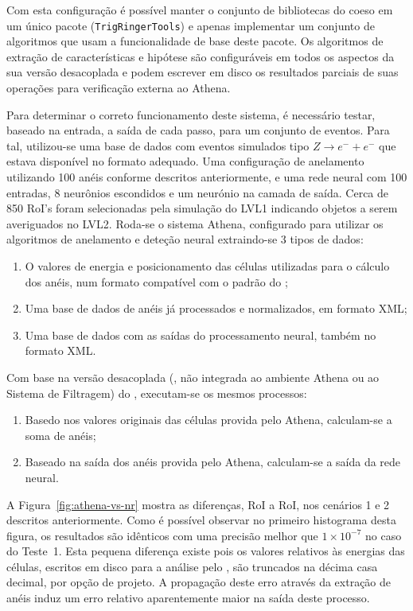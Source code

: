 Com esta configuração é possível manter o conjunto de bibliotecas do
 coeso em um único pacote (\texttt{TrigRingerTools}) e
apenas implementar um conjunto de algoritmos que usam a funcionalidade de base
deste pacote. Os algoritmos de extração de características e hipótese são
configuráveis em todos os aspectos da sua versão desacoplada e podem escrever
em disco os resultados parciais de suas operações para verificação externa ao
Athena.

Para determinar o correto funcionamento deste sistema, é necessário testar,
baseado na entrada, a saída de cada passo, para um conjunto de eventos. Para
tal, utilizou-se uma base de dados com eventos simulados tipo $Z \rightarrow
e^- + e^-$ que estava disponível no formato adequado. Uma configuração de
anelamento utilizando 100 anéis conforme descritos anteriormente, e uma rede
neural com 100 entradas, 8 neurônios escondidos e um neurónio na camada de
saída. Cerca de 850 RoI's foram selecionadas pela simulação do LVL1 indicando
objetos a serem averiguados no LVL2. Roda-se o sistema Athena, configurado
para utilizar os algoritmos de anelamento e deteção neural extraindo-se 3
tipos de dados:

\begin{enumerate}
\item O valores de energia e posicionamento das células utilizadas para o
cálculo dos anéis, num formato compatível com o padrão do ; 
\item Uma base de dados de anéis já processados e normalizados, em formato
XML;
\item Uma base de dados com as saídas do processamento neural, também no
formato XML.
\end{enumerate}

Com base na versão desacoplada (, não integrada ao ambiente
Athena ou ao Sistema de Filtragem) do , executam-se os mesmos
processos:

\begin{enumerate}
\item Basedo nos valores originais das células provida pelo Athena, calculam-se
a soma de anéis; 
\item Baseado na saída dos anéis provida pelo Athena, calculam-se a saída da
rede neural.
\end{enumerate}

A Figura~\ref{fig:athena-vs-nr} mostra as diferenças, RoI a RoI, nos cenários
1 e 2 descritos anteriormente. Como é possível observar no primeiro histograma
desta figura, os resultados são idênticos com uma precisão melhor que $1
\times 10^{-7}$ no caso do Teste~1. Esta pequena diferença existe pois os
valores relativos às energias das células, escritos em disco para a análise
pelo , são truncados na décima casa decimal, por opção de
projeto. A propagação deste erro através da extração de anéis induz um erro
relativo aparentemente maior na saída deste processo.

